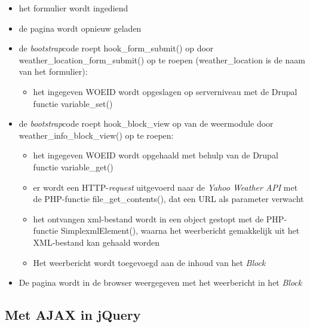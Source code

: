 \begin{itemize}
	\item het formulier wordt ingediend
	\item de pagina wordt opnieuw geladen
	\item de \textit{bootstrap}code roept hook\_form\_submit() op door weather\_location\_form\_submit() op te roepen (weather\_location is de naam van het formulier):
	\begin{itemize}
		\item het ingegeven WOEID wordt opgeslagen op serverniveau met de Drupal functie variable\_set()
	\end{itemize}
	\item de \textit{bootstrap}code roept hook\_block\_view op van de weermodule door weather\_info\_block\_view() op te roepen:
	\begin{itemize}
		\item het ingegeven WOEID wordt opgehaald met behulp van de Drupal functie variable\_get()
		\item er wordt een HTTP-\textit{request} uitgevoerd naar de \textit{Yahoo Weather API} met de PHP-functie file\_get\_contents(), dat een URL als parameter verwacht
		\item het ontvangen xml-bestand wordt in een object gestopt met de PHP-functie SimplexmlElement(), waarna het weerbericht gemakkelijk uit het XML-bestand kan gehaald worden
		\item Het weerbericht wordt toegevoegd aan de inhoud van het \textit{Block}
	\end{itemize}
	\item De pagina wordt in de browser weergegeven met het weerbericht in het \textit{Block}
\end{itemize}

\subsection{Met AJAX in jQuery}

